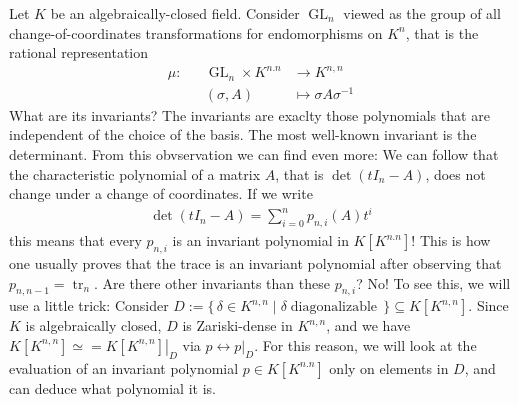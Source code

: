 \begin{example}
  Let $K$ be an algebraically-closed field.
  Consider $\operatorname{GL}_n$ viewed as the group of all change-of-coordinates transformations for endomorphisms on $K^n$, that is the rational representation
  \begin{equation}
    \begin{aligned}
      \mu \colon && \operatorname{GL}_n \times K^{n.n} & \longrightarrow K^{n,n} \\
      && (\sigma,A) &\longmapsto \sigma A \sigma^{-1}
    \end{aligned}
  \end{equation}
  What are its invariants?
  The invariants are exaclty those polynomials that are independent of the choice of the basis.
  The most well-known invariant is the determinant.
  From this obvservation we can find even more:
  We can follow that the characteristic polynomial of a matrix $A$, that is $\operatorname{det} (tI_n - A)$, does not change under a change of coordinates.
  If we write
  \begin{equation}
    \begin{aligned}
      \operatorname{det} (tI_n - A) = \sum_{i=0}^n p_{n,i} (A) t^i
    \end{aligned}
  \end{equation}
  this means that every $p_{n,i}$ is an invariant polynomial in $K[K^{n.n}]$!
  This is how one usually proves that the trace is an invariant polynomial after observing that $p_{n,n-1} = \operatorname{tr}_n$.
  Are there other invariants than these $p_{n,i}$?
  No!
  To see this, we will use a little trick:
  Consider $D := \{\, \delta \in K^{n,n} \mid \delta \operatorname{diagonalizable} \,\} \subseteq K[K^{n,n}]$.
  Since $K$ is algebraically closed, $D$ is Zariski-dense in $K^{n,n}$, and we have $K[K^{n,n}] \simeq = \left. K[K^{n,n}] \right|_{D}$ via $p \leftrightarrow \left. p \right|_{D}$.
  For this reason, we will look at the evaluation of an invariant polynomial $p \in K[K^{n.n}] $ only on elements in $D$, and can deduce what polynomial it is.


\end{example}

